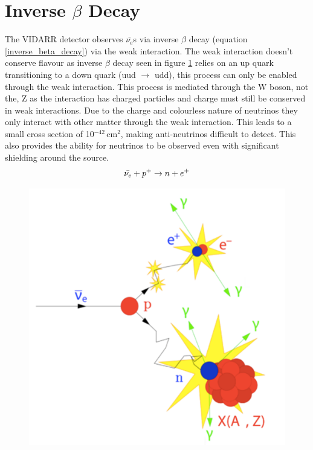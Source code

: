 \section{Inverse $\beta$ Decay}
The VIDARR detector observes $\bar{\nu_e}$s via inverse $\beta$ decay (equation {\ref{inverse_beta_decay}}) via the weak interaction. The weak interaction doesn't conserve flavour as inverse $\beta$ decay seen in figure \ref{fig:inverse_beta_diagram} relies on an up quark transitioning to a down quark (uud $\rightarrow$ udd), this process can only be enabled through the weak interaction. This process is mediated through the W boson, not the, Z as the interaction has charged particles and charge must still be conserved in weak interactions. Due to the charge and colourless nature of neutrinos they only interact with other matter through the weak interaction. This leads to a small cross section of 10$^{-42}$\,cm$^2$\cite{Vogel_1999}, making anti-neutrinos difficult to detect. This also provides the ability for neutrinos to be observed even with significant shielding around the source. 
\begin{equation}
    \Bar{\nu_e} + p^+ \rightarrow n + e^+
    \label{inverse_beta_decay}
\end{equation}

\begin{figure}[!h]
  \centering
  \includegraphics[width=0.5\linewidth]{Chapter2/Figs/Raster/inverse_beta_diagram.png} 
  \label{fig:inverse_beta_diagram}
\end{figure}

